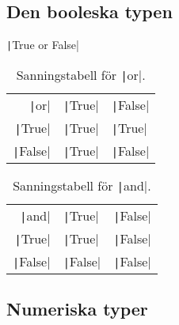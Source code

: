 \subsection{Den booleska typen}

\begin{frame}
  \begin{center}
    \texttt|True or False|
  \end{center}
\end{frame}

\begin{frame}
  \begin{table}
    \begin{tabular}{rll}
      \texttt|or| & \texttt|True| & \texttt|False| \\
      \texttt|True| & \texttt|True| & \texttt|True| \\
      \texttt|False| & \texttt|True| & \texttt|False|
    \end{tabular}
    \caption{Sanningstabell för \texttt|or|.}
  \end{table}

  \pause

  \begin{table}
    \begin{tabular}{rll}
      \texttt|and| & \texttt|True| & \texttt|False| \\
      \texttt|True| & \texttt|True| & \texttt|False| \\
      \texttt|False| & \texttt|False| & \texttt|False|
    \end{tabular}
    \caption{Sanningstabell för \texttt|and|.}
  \end{table}
\end{frame}


\subsection{Numeriska typer}

